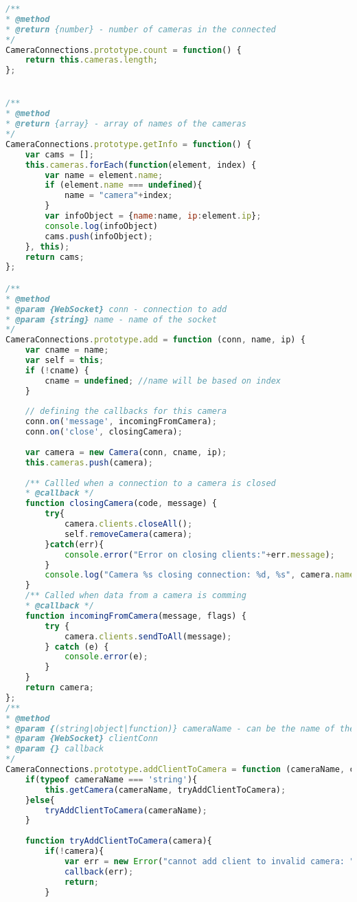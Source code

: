 \documentclass[hidelinks,11pt,a4paper,oneside,article]{memoir}
\begin{document}
\begin{lstlisting}[label={listing:nodejsimplementation},caption={implementation of server-side classes},language=JavaScript, style=styleprogramming]
/**
* @method
* @return {number} - number of cameras in the connected
*/
CameraConnections.prototype.count = function() {
    return this.cameras.length;
};


/**
* @method
* @return {array} - array of names of the cameras
*/
CameraConnections.prototype.getInfo = function() {
    var cams = [];
    this.cameras.forEach(function(element, index) {
        var name = element.name;
        if (element.name === undefined){
            name = "camera"+index;
        }
        var infoObject = {name:name, ip:element.ip};
        console.log(infoObject)
        cams.push(infoObject);
    }, this);
    return cams;    
};

/**
* @method
* @param {WebSocket} conn - connection to add
* @param {string} name - name of the socket
*/
CameraConnections.prototype.add = function (conn, name, ip) {
    var cname = name;
    var self = this;
    if (!cname) {
        cname = undefined; //name will be based on index
    }
    
    // defining the callbacks for this camera
    conn.on('message', incomingFromCamera);
    conn.on('close', closingCamera);
    
    var camera = new Camera(conn, cname, ip);
    this.cameras.push(camera);
    
    /** Callled when a connection to a camera is closed
    * @callback */
    function closingCamera(code, message) {
        try{
            camera.clients.closeAll();
            self.removeCamera(camera);
        }catch(err){
            console.error("Error on closing clients:"+err.message);
        }
        console.log("Camera %s closing connection: %d, %s", camera.name, code, message);
    }
    /** Called when data from a camera is comming
    * @callback */
    function incomingFromCamera(message, flags) {
        try {
            camera.clients.sendToAll(message);
        } catch (e) {
            console.error(e);
        }
    }
    return camera;
};
/**
* @method
* @param {(string|object|function)} cameraName - can be the name of the camera or a Camera object
* @param {WebSocket} clientConn
* @param {} callback
*/
CameraConnections.prototype.addClientToCamera = function (cameraName, clientConn, callback) {
    if(typeof cameraName === 'string'){
        this.getCamera(cameraName, tryAddClientToCamera);
    }else{
        tryAddClientToCamera(cameraName);
    }
    
    function tryAddClientToCamera(camera){
        if(!camera){
            var err = new Error("cannot add client to invalid camera: "+camera);
            callback(err);
            return;
        }
        

\end{lstlisting}
\end{document}
